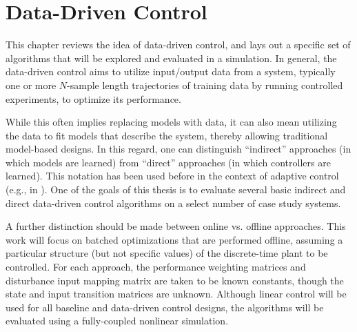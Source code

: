 \chapter{Data-Driven Control}
\label{chap:DataDrivenControl}
This chapter reviews the idea of data-driven control, and lays out a specific set of algorithms that will be explored and evaluated in a simulation.  In general, the data-driven control aims to utilize input/output data from a system, typically one or more $N$-sample length trajectories of training data by running controlled experiments, to optimize its performance.

While this often implies replacing models with data, it can also mean utilizing the data to fit models that describe the system, thereby allowing traditional model-based designs.  In this regard, one can distinguish ``indirect'' approaches (in which models are learned) from ``direct'' approaches (in which controllers are learned).  This notation has been used before in the context of adaptive control (e.g., in \cite{slotineli}).  One of the goals of this thesis is to evaluate several basic indirect and direct data-driven control algorithms on a select number of case study systems.

A further distinction should be made between online vs. offline approaches.  This work will focus on batched optimizations that are performed offline, assuming a particular structure (but not specific values) of the discrete-time plant to be controlled.  For each approach, the performance weighting matrices and disturbance input mapping matrix are taken to be known constants, though the state and input transition matrices are unknown.  Although linear control will be used for all baseline and data-driven control designs, the algorithms will be evaluated using a fully-coupled nonlinear simulation.

